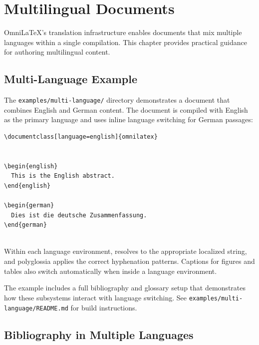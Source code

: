 \chapter{Multilingual Documents}
\label{ch:multilingual}

OmniLaTeX's translation infrastructure enables documents that mix multiple
languages within a single compilation.  This chapter provides practical
guidance for authoring multilingual content.

\section{Multi-Language Example}

The \texttt{examples/multi-language/} directory demonstrates a document
that combines English and German content.  The document is compiled with
English as the primary language and uses inline language switching for
German passages:

\begin{verbatim}
\documentclass[language=english]{omnilatex}


\begin{english}
  This is the English abstract.
\end{english}

\begin{german}
  Dies ist die deutsche Zusammenfassung.
\end{german}


\end{verbatim}

Within each language environment,  resolves to the
appropriate localized string, and polyglossia applies the correct
hyphenation patterns.  Captions for figures and tables also switch
automatically when inside a language environment.

The example includes a full bibliography and glossary setup that
demonstrates how these subsystems interact with language switching.
See \texttt{examples/multi-language/README.md} for build instructions.

\section{Bibliography in Multiple Languages}

